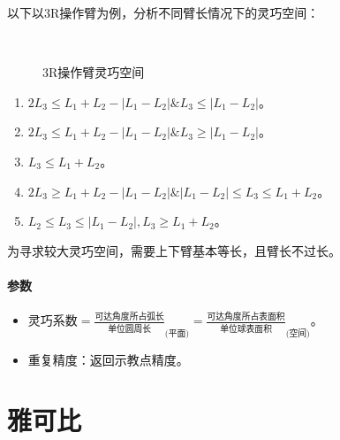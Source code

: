 \documentclass[
12pt, %
a4paper, 
oneside, %
headinclude,footinclude, %
]{scrartcl}
\begin{document}
以下以3R操作臂为例，分析不同臂长情况下的灵巧空间：
\begin{figure}[H]
\centering
{} \quad
{} \quad
{} \\
 \quad
{}
\caption[3R操作臂灵巧空间]{3R操作臂灵巧空间}
\end{figure}
\begin{enumerate}
\item $ 2L_3 \leq L_1 + L_2 - |L_1 - L_2|\&L_3 \leq |L_1 - L_2| $。
\item $ 2L_3 \leq L_1 + L_2 - |L_1 - L_2|\&L_3 \geq |L_1 - L_2| $。
\item $ L_3 \leq L_1 + L_2 $。
\item $ 2L_3 \geq L_1 + L_2 - |L_1 - L_2|\&|L_1 - L_2| \leq L_3 \leq L_1 + L_2 $。
\item $ L_2 \leq L_3 \leq |L_1 - L_2|, L_3 \geq L_1 + L_2 $。
\end{enumerate}

为寻求较大灵巧空间，需要上下臂基本等长，且臂长不过长。
\paragraph{参数}
\begin{itemize}
\item $ \text{灵巧系数} = \frac{\text{可达角度所占弧长}}{\text{单位圆周长}}_{\text{(平面)}} = \frac{\text{可达角度所占表面积}}{\text{单位球表面积}}_{\text{(空间)}} $。
\item 重复精度：返回示教点精度。
\end{itemize} 
\section{雅可比}
\end{document}
